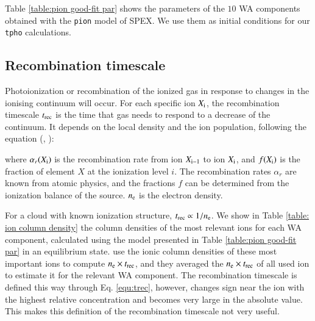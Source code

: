 \documentclass{aa}
\begin{document}
Table \ref{table:pion good-fit par} shows the parameters of the $10$ WA components obtained with the \texttt{pion} model of SPEX. We use them as initial conditions for our \texttt{tpho} calculations.




\subsection{Recombination timescale}
Photoionization or recombination of the ionized gas in response to changes in the ionising continuum will occur.
For each specific ion $ X_{\rm i}$, the recombination timescale $t_{\rm rec}$ is the time that gas needs to respond to a decrease of the continuum.
It depends on the local density and the ion population, following the equation (\citealp{Bottorff2000ApJ}, \citealp{Ebrero2016A&A}):


where $\alpha_r(X_{\rm i})$ is the recombination rate from ion $ X_{\rm i-1}$ to ion $X_{\rm i}$, and $ f(X_{\rm i})$ is the fraction of element $ X $ at the ionization level $i$. 
The recombination rates $ \alpha_r$ are known from atomic physics, and the fractions $f$ can be determined from the ionization balance of the source.
$n_{\rm e}$ is the electron density.


For a cloud with known ionization structure, \(  t_{\rm rec} \propto 1/n_{\rm e}\).
We show in Table \ref{table: ion column density} the column densities of the most relevant ions for each WA component, calculated using the model presented in Table \ref{table:pion good-fit par} in an equilibrium state.
\cite{Ebrero2016A&A} use the ionic column densities of these most important ions to compute $ n_{\rm e} \times t_{\rm rec}$, and they averaged the $ n_{\rm e} \times t_{\rm rec}$ of all used ion to estimate it for the relevant WA component.
The recombination timescale is defined this way through Eq. \ref{equ:trec}, however, changes sign near the ion with the highest relative concentration and becomes very large in the absolute value.
This makes this definition of the recombination timescale not very useful.
\end{document}
